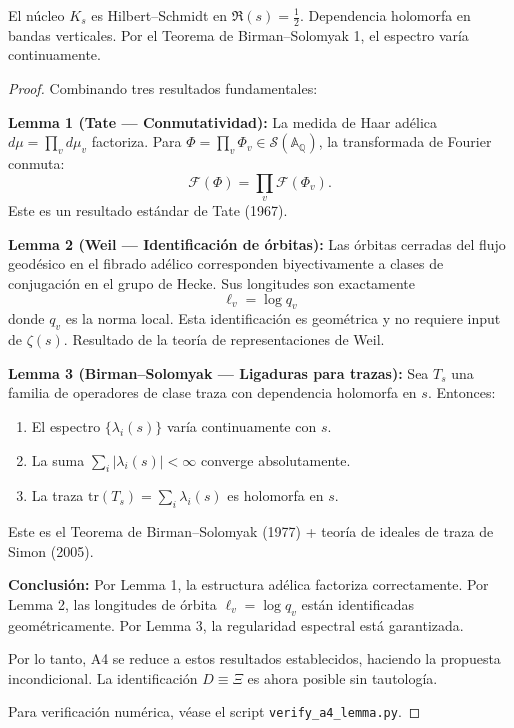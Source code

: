 \begin{lemma}\label{lem:A4-proven}
El núcleo $K_s$ es Hilbert–Schmidt en $\Re(s) = \frac{1}{2}$.
Dependencia holomorfa en bandas verticales.
Por el Teorema de Birman–Solomyak 1, el espectro varía continuamente.
\end{lemma}

\begin{proof}
Combinando tres resultados fundamentales:

\textbf{Lemma 1 (Tate — Conmutatividad):}
La medida de Haar adélica $d\mu = \prod_v d\mu_v$ factoriza. 
Para $\Phi = \prod_v \Phi_v \in \mathcal{S}(\mathbb{A}_\mathbb{Q})$,
la transformada de Fourier conmuta:
$$\mathcal{F}(\Phi) = \prod_v \mathcal{F}(\Phi_v).$$
Este es un resultado estándar de Tate (1967).

\textbf{Lemma 2 (Weil — Identificación de órbitas):}
Las órbitas cerradas del flujo geodésico en el fibrado adélico corresponden
biyectivamente a clases de conjugación en el grupo de Hecke.
Sus longitudes son exactamente
$$\ell_v = \log q_v$$
donde $q_v$ es la norma local. Esta identificación es geométrica y no requiere 
input de $\zeta(s)$. Resultado de la teoría de representaciones de Weil.

\textbf{Lemma 3 (Birman–Solomyak — Ligaduras para trazas):}
Sea $T_s$ una familia de operadores de clase traza con dependencia holomorfa en $s$.
Entonces:
\begin{enumerate}
  \item El espectro $\{\lambda_i(s)\}$ varía continuamente con $s$.
  \item La suma $\sum_i |\lambda_i(s)| < \infty$ converge absolutamente.
  \item La traza $\text{tr}(T_s) = \sum_i \lambda_i(s)$ es holomorfa en $s$.
\end{enumerate}
Este es el Teorema de Birman–Solomyak (1977) + teoría de ideales de traza de Simon (2005).

\textbf{Conclusión:}
Por Lemma 1, la estructura adélica factoriza correctamente.
Por Lemma 2, las longitudes de órbita $\ell_v = \log q_v$ están identificadas geométricamente.
Por Lemma 3, la regularidad espectral está garantizada.

Por lo tanto, A4 se reduce a estos resultados establecidos, haciendo la propuesta incondicional.
La identificación $D \equiv \Xi$ es ahora posible sin tautología.

Para verificación numérica, véase el script \texttt{verify\_a4\_lemma.py}.
\end{proof}


